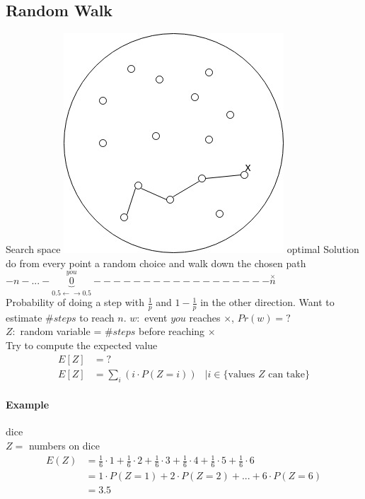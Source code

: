 \subsection{Random Walk}
Search space \includegraphics[scale=0.2]{randomizedAlg/opt-way.jpg} optimal Solution \\
do from every point a random choice and walk down the chosen path \\
$-n-...-\stackrel{you}{\underbrace{0}_{0.5 \leftarrow \rightarrow 0.5}}------------------\stackrel{\times}{n}$ \\
Probability of doing a step with $\frac{1}{p}$ and $1-\frac{1}{p}$ in the other direction. Want to estimate $\# steps$ to reach $n$. $w: $ event $you$ reaches $\times$, $Pr(w)=?$ \\
$Z:$ random variable = $\# steps$ before reaching $\times$ \\
Try to compute the expected value 
\begin{align*}
	E[Z] &= ? \\
	E[Z] &= \sum_i(i \cdot P(Z=i)) & |i \in \{\text{values $Z$ can take}\}
\end{align*}
\paragraph{Example} dice \\
$Z = $ numbers on dice 
\begin{align*}
E(Z) &= \frac{1}{6} \cdot 1 + \frac{1}{6} \cdot 2 + \frac{1}{6} \cdot 3 + \frac{1}{6} \cdot  4 + \frac{1}{6} \cdot 5 + \frac{1}{6} \cdot 6 \\
&= 1 \cdot P(Z=1) + 2 \cdot P(Z=2) + ... + 6 \cdot P(Z=6) \\
&= 3.5
\end{align*}

